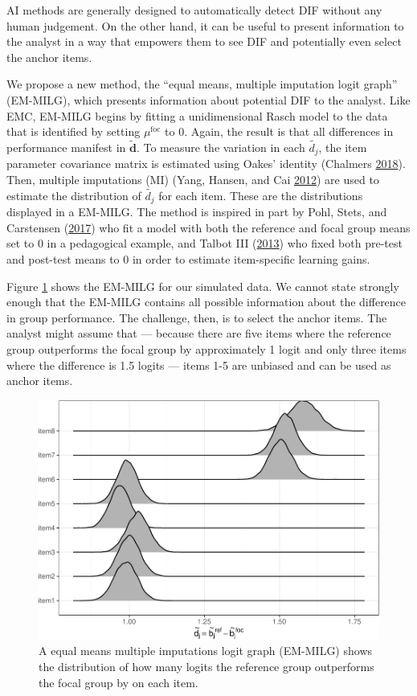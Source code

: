 \documentclass[
  11pt,
]{article}
\begin{document}
AI methods are generally designed to automatically detect DIF without any human judgement. On the other hand, it can be useful to present information to the analyst in a way that empowers them to see DIF and potentially even select the anchor items.

We propose a new method, the \enquote{equal means, multiple imputation logit graph} (EM-MILG), which presents information about potential DIF to the analyst. Like EMC, EM-MILG begins by fitting a unidimensional Rasch model to the data that is identified by setting \(\mu^\text{foc}\) to \(0\). Again, the result is that all differences in performance manifest in \(\tilde{\mathbf{d}}\). To measure the variation in each \(\tilde{{d_j}}\), the item parameter covariance matrix is estimated using Oakes' identity (Chalmers \protect\hyperlink{ref-chalmers2018numerical}{2018}). Then, multiple imputations (MI) (Yang, Hansen, and Cai \protect\hyperlink{ref-yang2012characterizing}{2012}) are used to estimate the distribution of \(\tilde{d_j}\) for each item. These are the distributions displayed in a EM-MILG. The method is inspired in part by Pohl, Stets, and Carstensen (\protect\hyperlink{ref-pohl2017cluster}{2017}) who fit a model with both the reference and focal group means set to 0 in a pedagogical example, and Talbot III (\protect\hyperlink{ref-talbot2013taking}{2013}) who fixed both pre-test and post-test means to 0 in order to estimate item-specific learning gains.

Figure \ref{fig:emmilg} shows the EM-MILG for our simulated data. We cannot state strongly enough that the EM-MILG contains all possible information about the difference in group performance. The challenge, then, is to select the anchor items. The analyst might assume that --- because there are five items where the reference group outperforms the focal group by approximately 1 logit and only three items where the difference is 1.5 logits --- items 1-5 are unbiased and can be used as anchor items.

\begin{figure}[H]

{\centering \includegraphics[width=0.7\linewidth]{paper_files/figure-latex/emmilg-1} 

}

\caption{A equal means multiple imputations logit graph (EM-MILG) shows the distribution of how many logits the reference group outperforms the focal group by on each item.}\label{fig:emmilg}
\end{figure}
\end{document}
